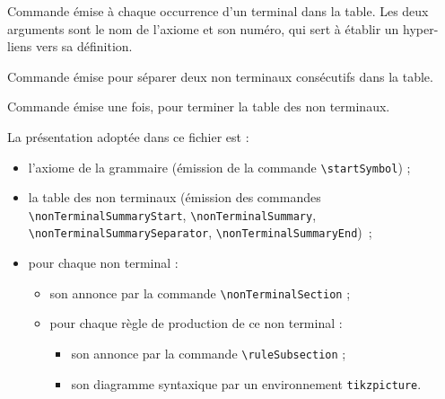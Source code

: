 
Commande émise à chaque occurrence d'un terminal dans la table.  Les deux arguments sont le nom de l'axiome et son numéro, qui sert à établir un hyper-liens vers sa définition.





Commande émise pour séparer deux non terminaux consécutifs dans la table.




Commande émise une fois, pour terminer la table des non terminaux.



La présentation adoptée dans ce fichier est :
\begin{itemize}
  \item l'axiome de la grammaire (émission de la commande \texttt{\small\textbackslash startSymbol}) ;
  \item la table des non terminaux (émission des commandes \texttt{\small\textbackslash nonTerminalSummaryStart}, \texttt{\small\textbackslash nonTerminalSummary}, \texttt{\small\textbackslash nonTerminalSummarySeparator}, \texttt{\small\textbackslash nonTerminalSummaryEnd})~;
  \item pour chaque non terminal :
  \begin{itemize}
    \item son annonce par la commande \texttt{\small\textbackslash nonTerminalSection} ;
    \item pour chaque règle de production de ce non terminal :
    \begin{itemize}
      \item son annonce par la commande \texttt{\small\textbackslash ruleSubsection} ;
      \item son diagramme syntaxique par un environnement \texttt{tikzpicture}.
    \end{itemize}
  \end{itemize}
\end{itemize}



